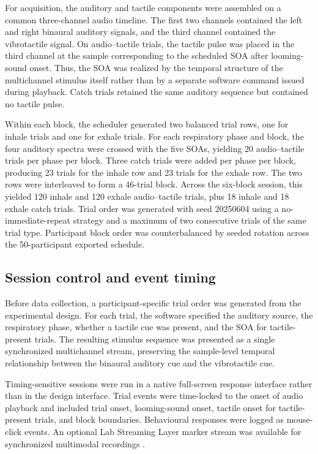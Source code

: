 For acquisition, the auditory and tactile components were assembled on a
common three-channel audio timeline. The first two channels contained the left
and right binaural auditory signals, and the third channel contained the
vibrotactile signal. On audio--tactile trials, the tactile pulse was placed in
the third channel at the sample corresponding to the scheduled SOA after
looming-sound onset. Thus, the SOA was realized by the temporal structure of
the multichannel stimulus itself rather than by a separate software command
issued during playback. Catch trials retained the same auditory sequence but
contained no tactile pulse.

Within each block, the scheduler generated two balanced trial rows, one for
inhale trials and one for exhale trials. For each respiratory phase and block,
the four auditory spectra were crossed with the five SOAs, yielding 20
audio--tactile trials per phase per block. Three catch trials were added per
phase per block, producing 23 trials for the inhale row and 23 trials for the
exhale row. The two rows were interleaved to form a 46-trial block. Across the
six-block session, this yielded 120 inhale and 120 exhale audio--tactile
trials, plus 18 inhale and 18 exhale catch trials. Trial order was generated
with seed 20250604 using a no-immediate-repeat strategy and a maximum of two
consecutive trials of the same trial type. Participant block order was
counterbalanced by seeded rotation across the 50-participant exported schedule.

\subsection{Session control and event timing}

Before data collection, a participant-specific trial order was generated from
the experimental design. For each trial, the software specified the auditory
source, the respiratory phase, whether a tactile cue was present, and the SOA
for tactile-present trials. The resulting stimulus sequence was presented as a
single synchronized multichannel stream, preserving the sample-level temporal
relationship between the binaural auditory cue and the vibrotactile cue.

Timing-sensitive sessions were run in a native full-screen response interface
rather than in the design interface. Trial events were time-locked to the onset
of audio playback and included trial onset, looming-sound onset, tactile onset
for tactile-present trials, and block boundaries. Behavioural responses were
logged as mouse-click events. An optional Lab Streaming Layer marker stream was
available for synchronized multimodal recordings \citep{Kothe2025LSL}.

